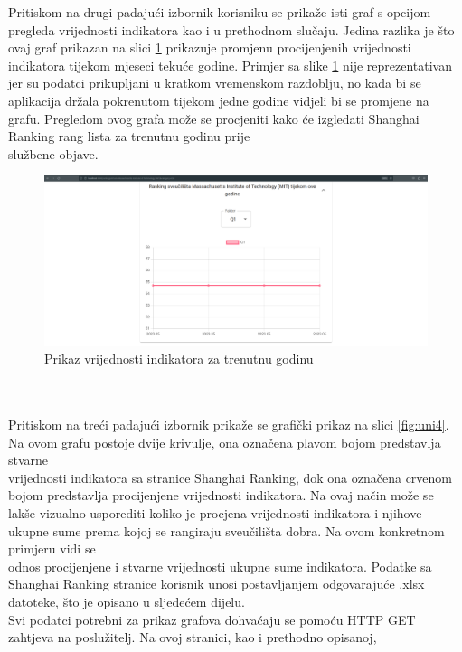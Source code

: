 \documentclass[times, utf8, zavrsni]{fer}
\begin{document}
Pritiskom na drugi padajući izbornik korisniku se prikaže isti graf s opcijom pregleda vrijednosti indikatora
kao i u prethodnom slučaju. Jedina razlika je što ovaj graf prikazan na slici \ref{fig:uni3}
prikazuje promjenu procijenjenih vrijednosti indikatora tijekom mjeseci tekuće godine. Primjer sa slike \ref{fig:uni3} nije reprezentativan jer su podatci 
prikupljani u kratkom vremenskom razdoblju, no kada bi se aplikacija držala pokrenutom tijekom jedne godine vidjeli bi se promjene na grafu. Pregledom ovog 
grafa može se procjeniti kako će izgledati Shanghai Ranking rang lista za trenutnu godinu prije \\službene objave. 
\begin{figure}[htb]
    \hspace*{-2cm}  
       \includegraphics[scale=0.21]{uni3.png} 
       \caption{Prikaz vrijednosti indikatora za trenutnu godinu}
       \label{fig:uni3}
       \end{figure} 
\\\\Pritiskom na treći padajući izbornik prikaže se grafički prikaz na slici \ref{fig:uni4}. Na ovom grafu postoje dvije krivulje, ona označena plavom bojom predstavlja 
stvarne \\vrijednosti indikatora sa stranice Shanghai Ranking, dok ona označena crvenom bojom predstavlja procijenjene vrijednosti indikatora.
Na ovaj način može se lakše vizualno usporediti koliko je procjena vrijednosti indikatora i njihove ukupne sume  prema kojoj se rangiraju sveučilišta dobra. 
Na ovom konkretnom primjeru vidi se \\odnos procijenjene i stvarne 
vrijednosti ukupne sume indikatora.
Podatke sa Shanghai Ranking stranice korisnik unosi postavljanjem  
odgovarajuće .xlsx datoteke, što je opisano u sljedećem dijelu.
\\Svi podatci potrebni za prikaz grafova dohvaćaju se pomoću HTTP GET zahtjeva na poslužitelj. Na ovoj stranici, kao i prethodno opisanoj, 
\end{document}
